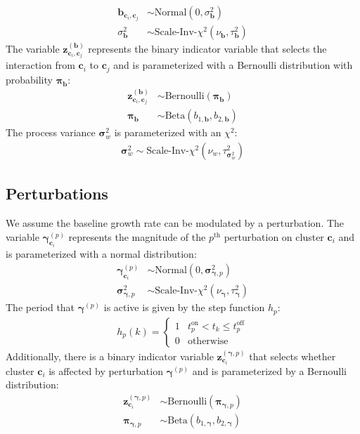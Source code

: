 \documentclass{article}
\newcommand{\Normaldist}{\text{Normal}}
\newcommand{\ScaledInvChiSquaredTdist}{\text{Scale-Inv-}$\chi^2$} %
\newcommand{\ScaledInvChiSquareddist}{\text{Scale-Inv-}\chi^2}
\newcommand{\Betadist}{\text{Beta}}
\newcommand{\Bernoullidist}{\text{Bernoulli}}
\newcommand{\ci}[1]{\mathbf{c}_{#1}}
\newcommand{\interact}{\mathbf{b}}
\newcommand{\interactcij}[2]{\interact_{\ci{#1}, \ci{#2}}}
\newcommand{\zinteractcij}[2]{\mathbf{z}^{(\interact)}_{\ci{#1}, \ci{#2}}}
\newcommand{\varinteract}{\sigma^2_{\interact}}
\newcommand{\dofinteract}{\nu_{\interact}}
\newcommand{\scaleinteract}{\tau^2_{\interact}}
\newcommand{\probinteract}{\mathbf{\pi}_{\interact}}
\newcommand{\pert}{\mathbf{\gamma}}
\newcommand{\perti}[1]{\mathbf{\gamma}^{(#1)}} %
\newcommand{\pertic}[2]{\mathbf{\gamma}^{(#1)}_{\ci{#2}}} %
\newcommand{\zpertic}[2]{\mathbf{z}^{(\pert, #1)}_{\ci{#2}}}
\newcommand{\varperti}[1]{\mathbf{\sigma}^2_{\pert, #1}}
\newcommand{\dofpert}{\nu_{\pert}}
\newcommand{\scalepert}{\tau^2_{\pert}}
\newcommand{\probperti}[1]{\mathbf{\pi}_{\pert, #1}}
\newcommand{\stepperti}[1]{h_{#1}}
\newcommand{\pv}{\mathbf{\sigma}_w^2}
\newcommand{\dofpv}{\nu_w}
\newcommand{\scalepv}{\tau^2_{\pv}}
\begin{document}
\begin{align}
    \interactcij{i}{j} & \sim \Normaldist ( 0, \varinteract ) \\
    \varinteract & \sim \ScaledInvChiSquareddist (\dofinteract, \scaleinteract)
\end{align}
The variable $\zinteractcij{i}{j}$ represents the binary indicator variable that selects the interaction from $\ci{i}$ to $\ci{j}$ and is parameterized with a Bernoulli distribution with probability $\probinteract$:
\begin{align}
    \zinteractcij{i}{j} & \sim \Bernoullidist (\probinteract) \\
    \probinteract & \sim \Betadist ( b_{1,\interact} , b_{2,\interact} )
\end{align}
The process variance $\pv$ is parameterized with an \ScaledInvChiSquaredTdist:
\begin{align}
    \pv \sim \ScaledInvChiSquareddist (\dofpv, \scalepv)
\end{align}

\subsection{Perturbations}
We assume the baseline growth rate can be modulated by a perturbation. The variable $\pertic{p}{i}$ represents the magnitude of the $p^{\text{th}}$ perturbation on cluster $\ci{i}$ and is parameterized with a normal distribution:
\begin{align}
    \pertic{p}{i} & \sim \Normaldist ( 0, \varperti{p} ) \\
    \varperti{p} & \sim \ScaledInvChiSquareddist (\dofpert, \scalepert)
\end{align}
The period that $\perti{p}$ is active is given by the step function $\stepperti{p}$:
\begin{align}
    \stepperti{p} (k) = \begin{cases}
        1 & t^{\text{on}}_p < t_k \le t^{\text{off}}_p \\
        0 & \text{otherwise}
    \end{cases}
\end{align}
Additionally, there is a binary indicator variable $\zpertic{p}{i}$ that selects whether cluster $\ci{i}$ is affected by perturbation $\perti{p}$ and is parameterized by a Bernoulli distribution:
\begin{align}
    \zpertic{p}{i} & \sim \Bernoullidist (\probperti{p}) \\
    \probperti{p} & \sim \Betadist ( b_{1,\pert} , b_{2,\pert} )
\end{align}
\end{document}
